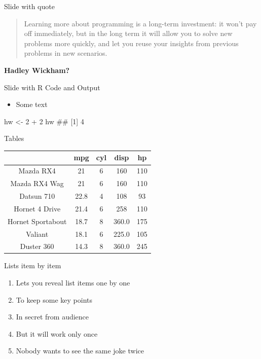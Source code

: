 \documentclass[ignorenonframetext,]{beamer}
\newenvironment{Shaded}{}{}
\newcommand{\CommentTok}[1]{\textcolor[rgb]{0.00,0.50,0.00}{#1}}
\newcommand{\DecValTok}[1]{#1}
\newcommand{\NormalTok}[1]{#1}
\newcommand{\OperatorTok}[1]{#1}
\newcommand{\StringTok}[1]{\textcolor[rgb]{0.00,0.50,0.50}{#1}}
\providecommand{\tightlist}{%
  \setlength{\itemsep}{0pt}\setlength{\parskip}{0pt}}
\begin{document}
\begin{frame}{Slide with quote}
\protect\hypertarget{slide-with-quote}{}

\begin{quote}
Learning more about programming is a long-term investment: it won't pay
off immediately, but in the long term it will allow you to solve new
problems more quickly, and let you reuse your insights from previous
problems in new scenarios.
\end{quote}

\textbf{Hadley Wickham? }

\end{frame}

\begin{frame}[fragile]{Slide with R Code and Output}
\protect\hypertarget{slide-with-r-code-and-output}{}

\begin{itemize}
\tightlist
\item
  Some text \scriptsize
\end{itemize}

\begin{Shaded}
\begin{Highlighting}[]
\NormalTok{hw <-}\StringTok{ }\DecValTok{2} \OperatorTok{+}\StringTok{ }\DecValTok{2}
\NormalTok{hw}
\CommentTok{## [1] 4}
\end{Highlighting}
\end{Shaded}

\end{frame}

\begin{frame}{Tables}
\protect\hypertarget{tables}{}

\begin{longtable}[]{@{}ccccc@{}}
\toprule
& mpg & cyl & disp & hp\tabularnewline
\midrule
\endhead
Mazda RX4 & 21 & 6 & 160 & 110\tabularnewline
Mazda RX4 Wag & 21 & 6 & 160 & 110\tabularnewline
Datsun 710 & 22.8 & 4 & 108 & 93\tabularnewline
Hornet 4 Drive & 21.4 & 6 & 258 & 110\tabularnewline
Hornet Sportabout & 18.7 & 8 & 360.0 & 175\tabularnewline
Valiant & 18.1 & 6 & 225.0 & 105\tabularnewline
Duster 360 & 14.3 & 8 & 360.0 & 245\tabularnewline
\bottomrule
\end{longtable}

\end{frame}

\begin{frame}{Lists item by item}
\protect\hypertarget{lists-item-by-item}{}

\begin{enumerate}[<+->]
\tightlist
\item
  Lets you reveal list items one by one
\item
  To keep some key points
\item
  In secret from audience
\item
  But it will work only once
\item
  Nobody wants to see the same joke twice
\end{enumerate}

\end{frame}
\end{document}
